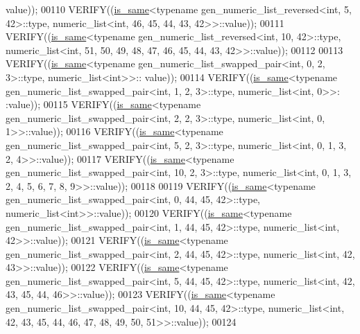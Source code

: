 \begin{DoxyCode}
      value));
00110   VERIFY((\hyperlink{struct_eigen_1_1internal_1_1is__same}{is\_same}<\textcolor{keyword}{typename} gen\_numeric\_list\_reversed<int, 5, 42>::type, numeric\_list<int, 46, 45,
       44, 43, 42>>::value));
00111   VERIFY((\hyperlink{struct_eigen_1_1internal_1_1is__same}{is\_same}<\textcolor{keyword}{typename} gen\_numeric\_list\_reversed<int, 10, 42>::type, numeric\_list<int, 51, 50,
       49, 48, 47, 46, 45, 44, 43, 42>>::value));
00112 
00113   VERIFY((\hyperlink{struct_eigen_1_1internal_1_1is__same}{is\_same}<\textcolor{keyword}{typename} gen\_numeric\_list\_swapped\_pair<int, 0, 2, 3>::type, numeric\_list<int>>::
      value));
00114   VERIFY((\hyperlink{struct_eigen_1_1internal_1_1is__same}{is\_same}<\textcolor{keyword}{typename} gen\_numeric\_list\_swapped\_pair<int, 1, 2, 3>::type, numeric\_list<int, 0>>:
      :value));
00115   VERIFY((\hyperlink{struct_eigen_1_1internal_1_1is__same}{is\_same}<\textcolor{keyword}{typename} gen\_numeric\_list\_swapped\_pair<int, 2, 2, 3>::type, numeric\_list<int, 0,
       1>>::value));
00116   VERIFY((\hyperlink{struct_eigen_1_1internal_1_1is__same}{is\_same}<\textcolor{keyword}{typename} gen\_numeric\_list\_swapped\_pair<int, 5, 2, 3>::type, numeric\_list<int, 0,
       1, 3, 2, 4>>::value));
00117   VERIFY((\hyperlink{struct_eigen_1_1internal_1_1is__same}{is\_same}<\textcolor{keyword}{typename} gen\_numeric\_list\_swapped\_pair<int, 10, 2, 3>::type, numeric\_list<int, 0,
       1, 3, 2, 4, 5, 6, 7, 8, 9>>::value));
00118 
00119   VERIFY((\hyperlink{struct_eigen_1_1internal_1_1is__same}{is\_same}<\textcolor{keyword}{typename} gen\_numeric\_list\_swapped\_pair<int, 0, 44, 45, 42>::type, 
      numeric\_list<int>>::value));
00120   VERIFY((\hyperlink{struct_eigen_1_1internal_1_1is__same}{is\_same}<\textcolor{keyword}{typename} gen\_numeric\_list\_swapped\_pair<int, 1, 44, 45, 42>::type, 
      numeric\_list<int, 42>>::value));
00121   VERIFY((\hyperlink{struct_eigen_1_1internal_1_1is__same}{is\_same}<\textcolor{keyword}{typename} gen\_numeric\_list\_swapped\_pair<int, 2, 44, 45, 42>::type, 
      numeric\_list<int, 42, 43>>::value));
00122   VERIFY((\hyperlink{struct_eigen_1_1internal_1_1is__same}{is\_same}<\textcolor{keyword}{typename} gen\_numeric\_list\_swapped\_pair<int, 5, 44, 45, 42>::type, 
      numeric\_list<int, 42, 43, 45, 44, 46>>::value));
00123   VERIFY((\hyperlink{struct_eigen_1_1internal_1_1is__same}{is\_same}<\textcolor{keyword}{typename} gen\_numeric\_list\_swapped\_pair<int, 10, 44, 45, 42>::type, 
      numeric\_list<int, 42, 43, 45, 44, 46, 47, 48, 49, 50, 51>>::value));
00124 

\end{DoxyCode}
